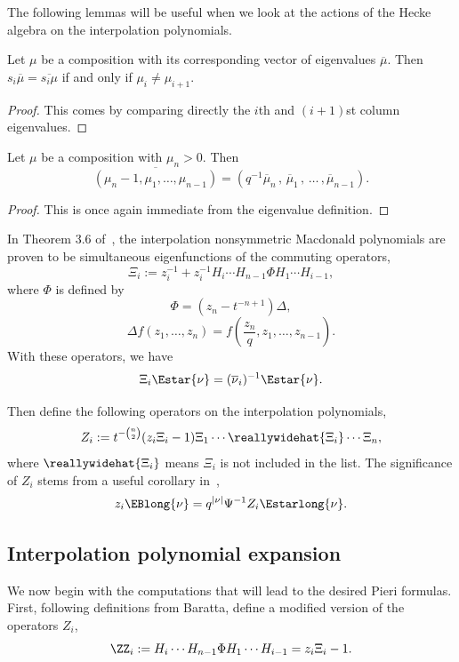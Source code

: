The following lemmas will be useful when we look at the actions of the Hecke algebra on the interpolation polynomials.

\begin{lemm}\label{eigenvaluepermutations}
Let $\mu$ be a composition with its corresponding vector of eigenvalues $\overline{\mu}$. Then $s_i \overline{\mu} = \overline{s_i\mu}$ if and only if $\mu_i \neq \mu_{i+1}$.
\end{lemm}
\begin{proof}
This comes by comparing directly the $i$th and $(i+1)$st column eigenvalues.
 \end{proof}

\begin{lemm}\label{eigentwo}
Let $\mu$ be a composition with $\mu_n>0$. Then
\[\overline{(\mu_n-1, \mu_1, \dotsc, \mu_{n-1})} = (q^{-1} \overline{\mu}_n\, , \, \overline{\mu}_1\, , \, \dotsc\, , \overline{\mu}_{n-1}).\]
\end{lemm}
\begin{proof}
This is once again immediate from the eigenvalue definition.
\end{proof}



In Theorem 3.6 of~\cite{MR1456318}, the interpolation nonsymmetric Macdonald polynomials are proven to be simultaneous eigenfunctions of the commuting operators,
\[ \Xi_i := z_i^{-1} + z_i^{-1}H_i \dotsm H_{n-1} \Phi H_1 \dotsm H_{i-1},\]
where $\Phi$ is defined by
\[ \Phi = (z_n-t^{-n+1})\Delta,\]
\[ \Delta f(z_1, \dotsc, z_n) = f\left(\frac{z_n}{q}, z_1, \dotsc, z_{n-1}\right).\]
With these operators, we have
\[ \Xi_i \Estar{\nu}=(\overline{\nu}_i)^{-1} \Estar{\nu}.\]

Then define the following operators on the interpolation polynomials,
\[ Z_i := t^{-\binom{n}{2}} (z_i \Xi_i-1) \Xi_1 \dotsm \reallywidehat{\Xi_i} \dotsm \Xi_n,\]
where $\reallywidehat{\Xi_i}$ means $\Xi_i$ is not included in the list. 
The significance of $Z_i$ stems from a useful corollary in~\cite{MR2525842},
\begin{equation}\label{isomorphism} z_i \EBlong{\nu} = q^{|\nu|} \Psi^{-1} Z_i \Estarlong{\nu}.\end{equation}

    \subsection{Interpolation polynomial expansion}
We now begin with the computations that will lead to the desired Pieri formulas. First, following definitions from Baratta, define a modified version of the operators $Z_i$,
\[ \ZZ_i := H_i \dotsm H_{n-1} \Phi H_1 \dotsm H_{i-1}=z_i \Xi_i - 1. \]

